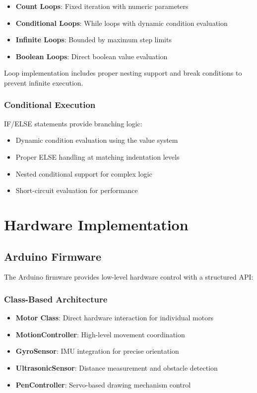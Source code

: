 \begin{itemize}
    \item \textbf{Count Loops}: Fixed iteration with numeric parameters
    \item \textbf{Conditional Loops}: While loops with dynamic condition evaluation
    \item \textbf{Infinite Loops}: Bounded by maximum step limits
    \item \textbf{Boolean Loops}: Direct boolean value evaluation
\end{itemize}

Loop implementation includes proper nesting support and break conditions to prevent infinite execution.

\subsubsection{Conditional Execution}

IF/ELSE statements provide branching logic:

\begin{itemize}
    \item Dynamic condition evaluation using the value system
    \item Proper ELSE handling at matching indentation levels
    \item Nested conditional support for complex logic
    \item Short-circuit evaluation for performance
\end{itemize}

\section{Hardware Implementation}

\subsection{Arduino Firmware}

The Arduino firmware provides low-level hardware control with a structured API:

\subsubsection{Class-Based Architecture}

\begin{itemize}
    \item \textbf{Motor Class}: Direct hardware interaction for individual motors
    \item \textbf{MotionController}: High-level movement coordination
    \item \textbf{GyroSensor}: IMU integration for precise orientation
    \item \textbf{UltrasonicSensor}: Distance measurement and obstacle detection
    \item \textbf{PenController}: Servo-based drawing mechanism control
\end{itemize}


